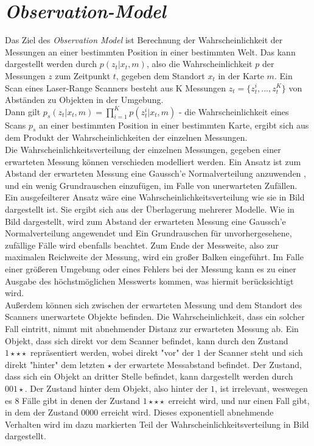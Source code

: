 \section{\textit{Observation-Model}}\label{sec:Observation-Model}
Das Ziel des \textit{Observation Model} ist Berechnung der Wahrscheinlichkeit der Messungen an einer bestimmten Position in einer bestimmten Welt. Das kann dargestellt werden durch $p(z_t|x_t, m)$, also die Wahrscheinlichkeit $p$ der Messungen $z$ zum Zeitpunkt $t$, gegeben dem Standort $x_t$ in der Karte $m$. Ein Scan eines Laser-Range Scanners besteht aus K Messungen $z_t =\{z_t^i, ..., z_t^K\}$ von Abständen zu Objekten in der Umgebung. \\
Dann gilt $p_s(z_t|x_t,m)=\prod_{i=1}^K p(z_t^i|x_t,m)$ - die Wahrscheinlichkeit eines Scans $p_s$ an einer bestimmten Position in einer bestimmten Karte, ergibt sich aus dem Produkt der Wahrscheinlichkeiten der einzelnen Messungen.\\
Die Wahrscheinlichkeitsverteilung der einzelnen Messungen, gegeben einer erwarteten Messung können verschieden modelliert werden. Ein Ansatz ist zum Abstand der erwarteten Messung eine Gaussch'e Normalverteilung anzuwenden , und ein wenig Grundrauschen einzufügen, im Falle von unerwarteten Zufällen. Ein ausgefeilterer Ansatz wäre eine Wahrscheinlichkeitsverteilung wie sie in Bild dargestellt ist. Sie ergibt sich aus der Überlagerung mehrerer Modelle. Wie in Bild dargestellt, wird zum Abstand der erwarteten Messung eine Gaussch'e Normalverteilung angewendet und Ein Grundrauschen für unvorhergesehene, zufällige Fälle wird ebenfalls beachtet. Zum Ende der Messweite, also zur maximalen Reichweite der Messung, wird ein großer Balken eingeführt. Im Falle einer größeren Umgebung oder eines Fehlers bei der Messung kann es zu einer Ausgabe des höchstmöglichen Messwerts kommen, was hiermit berücksichtigt wird.\\
Außerdem können sich zwischen der erwarteten Messung und dem Standort des Scanners unerwartete Objekte befinden. Die Wahrscheinlichkeit, dass ein solcher Fall eintritt, nimmt mit abnehmender Distanz zur erwarteten Messung ab. Ein Objekt, dass sich direkt vor dem Scanner befindet, kann durch den Zustand $1\star\star\star$ repräsentiert werden, wobei direkt "vor" der $1$ der Scanner steht und sich direkt "hinter" dem letzten $\star$ der erwartete Messabstand befindet. Der Zustand, dass sich ein Objekt an dritter Stelle befindet, kann dargestellt werden durch $001\star$. Der Zustand hinter dem Objekt, also hinter der $1$, ist irrelevant, weswegen es 8 Fälle gibt in denen der Zustand $1\star\star\star$ erreicht wird, und nur einen Fall gibt, in dem der Zustand $0000$ erreicht wird. Dieses exponentiell abnehmende Verhalten wird im dazu markierten Teil der Wahrscheinlichkeitsverteilung in Bild dargestellt.\\
